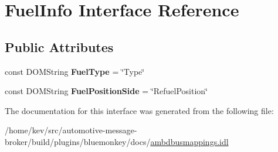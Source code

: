 \hypertarget{interfaceFuelInfo}{\section{Fuel\+Info Interface Reference}
\label{interfaceFuelInfo}
}
\subsection*{Public Attributes}
\begin{DoxyCompactItemize}
\item 
\hypertarget{interfaceFuelInfo_ae03d6729f1cfa4cd66d65c31fc8869af}{const D\+O\+M\+String {\bfseries Fuel\+Type} = \char`\"{}Type\char`\"{}}\label{interfaceFuelInfo_ae03d6729f1cfa4cd66d65c31fc8869af}

\item 
\hypertarget{interfaceFuelInfo_ae49699a8b45e535b48ff915ef2998805}{const D\+O\+M\+String {\bfseries Fuel\+Position\+Side} = \char`\"{}Refuel\+Position\char`\"{}}\label{interfaceFuelInfo_ae49699a8b45e535b48ff915ef2998805}

\end{DoxyCompactItemize}


The documentation for this interface was generated from the following file\+:\begin{DoxyCompactItemize}
\item 
/home/kev/src/automotive-\/message-\/broker/build/plugins/bluemonkey/docs/\hyperlink{ambdbusmappings_8idl}{ambdbusmappings.\+idl}\end{DoxyCompactItemize}
